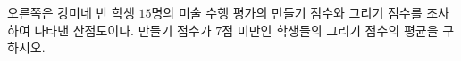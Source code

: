 \noindent\begin{minipage}[t]{0.58\linewidth}\vspace{0pt}\raggedright 오른쪽은 강미네 반 학생 $15$명의 미술 수행 평가의 만들기 점수와 그리기 점수를 조사하여 나타낸 산점도이다. 만들기 점수가 $7$점 미만인 학생들의 그리기 점수의 평균을 구하시오.\end{minipage}\hfill\begin{minipage}[t]{0.4\linewidth}\vspace{0pt}\centering \resizebox{\ifdim\width>\linewidth\linewidth\else\width\fi}{!}{}\end{minipage}\par
